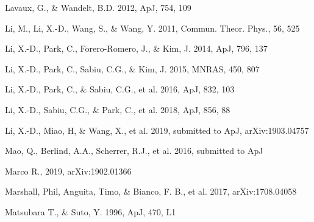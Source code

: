 \documentclass[twocolumn]{aastex61}
\begin{document}
\begin{thebibliography}{}
Lavaux, G., \& Wandelt, B.D. 2012, ApJ, 754, 109




Li, M., Li, X.-D., Wang, S., \& Wang, Y. 2011, Commun. Theor. Phys., 56, 525

Li, X.-D., Park, C., Forero-Romero, J., \& Kim, J. 2014, ApJ, 796, 137

Li, X.-D., Park, C., Sabiu, C.G., \& Kim, J. 2015, MNRAS, 450, 807 

%
Li, X.-D., Park, C., \& Sabiu, C.G., et al. 2016, ApJ, 832, 103

%
Li, X.-D., Sabiu, C.G., \& Park, C., et al. 2018, ApJ, 856, 88

%
Li, X.-D., Miao, H, \& Wang, X., et al. 2019, submitted to ApJ, arXiv:1903.04757





Mao, Q., Berlind, A.A., Scherrer, R.J., et al. 2016, submitted to ApJ



Marco R., 2019, arXiv:1902.01366 

Marshall, Phil, Anguita, Timo, \& Bianco, F. B., et al. 2017, arXiv:1708.04058

Matsubara T., \& Suto, Y. 1996, ApJ, 470, L1  


\end{thebibliography}
\end{document}
